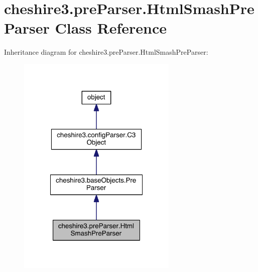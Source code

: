 \hypertarget{classcheshire3_1_1pre_parser_1_1_html_smash_pre_parser}{\section{cheshire3.\-pre\-Parser.\-Html\-Smash\-Pre\-Parser Class Reference}
\label{classcheshire3_1_1pre_parser_1_1_html_smash_pre_parser}
}


Inheritance diagram for cheshire3.\-pre\-Parser.\-Html\-Smash\-Pre\-Parser\-:
\nopagebreak
\begin{figure}[H]
\begin{center}
\leavevmode
\includegraphics[width=216pt]{classcheshire3_1_1pre_parser_1_1_html_smash_pre_parser__inherit__graph}
\end{center}
\end{figure}


